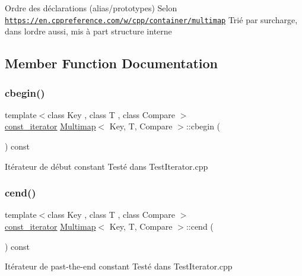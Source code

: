 Ordre des déclarations (alias/prototypes) Selon \href{https://en.cppreference.com/w/cpp/container/multimap}{\tt https\+://en.\+cppreference.\+com/w/cpp/container/multimap} Trié par surcharge, dans l\textquotesingle{}ordre aussi, mis à part structure interne 

\subsection{Member Function Documentation}
\mbox{\label{classMultimap_a216f03259a422977ea001d281a810248}} 
\subsubsection{\texorpdfstring{cbegin()}{cbegin()}}
{\footnotesize\ttfamily template$<$class Key , class T , class Compare $>$ \\
\hyperlink{classMultimapIterator}{const\+\_\+iterator} \hyperlink{classMultimap}{Multimap}$<$ Key, T, Compare $>$\+::cbegin (\begin{DoxyParamCaption}{ }\end{DoxyParamCaption}) const\hspace{0.3cm}{\ttfamily [inline]}}

Itérateur de début constant Testé dans Test\+Iterator.\+cpp \mbox{\label{classMultimap_a7e162ec76d003b3f888c8859a9b6ca03}} 
\subsubsection{\texorpdfstring{cend()}{cend()}}
{\footnotesize\ttfamily template$<$class Key , class T , class Compare $>$ \\
\hyperlink{classMultimapIterator}{const\+\_\+iterator} \hyperlink{classMultimap}{Multimap}$<$ Key, T, Compare $>$\+::cend (\begin{DoxyParamCaption}{ }\end{DoxyParamCaption}) const\hspace{0.3cm}{\ttfamily [inline]}}

Itérateur de past-\/the-\/end constant Testé dans Test\+Iterator.\+cpp \mbox{\label{classMultimap_a0a507d3094aaa271c3f5932c9acef378}} 
